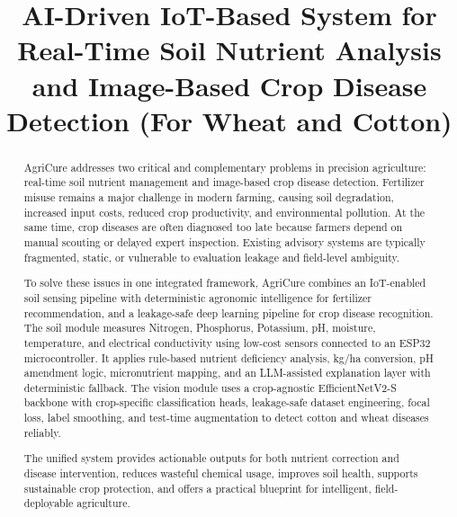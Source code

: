 \documentclass[conference]{IEEEtran}
\begin{document}
\title{AI-Driven IoT-Based System for Real-Time Soil Nutrient Analysis and Image-Based Crop Disease Detection (For Wheat and Cotton)}

\author{

\vspace{0.4cm}

}

\maketitle

\begin{abstract}
AgriCure addresses two critical and complementary problems in precision agriculture: real-time soil nutrient management and image-based crop disease detection. Fertilizer misuse remains a major challenge in modern farming, causing soil degradation, increased input costs, reduced crop productivity, and environmental pollution. At the same time, crop diseases are often diagnosed too late because farmers depend on manual scouting or delayed expert inspection. Existing advisory systems are typically fragmented, static, or vulnerable to evaluation leakage and field-level ambiguity.

To solve these issues in one integrated framework, AgriCure combines an IoT-enabled soil sensing pipeline with deterministic agronomic intelligence for fertilizer recommendation, and a leakage-safe deep learning pipeline for crop disease recognition. The soil module measures Nitrogen, Phosphorus, Potassium, pH, moisture, temperature, and electrical conductivity using low-cost sensors connected to an ESP32 microcontroller. It applies rule-based nutrient deficiency analysis, kg/ha conversion, pH amendment logic, micronutrient mapping, and an LLM-assisted explanation layer with deterministic fallback. The vision module uses a crop-agnostic EfficientNetV2-S backbone with crop-specific classification heads, leakage-safe dataset engineering, focal loss, label smoothing, and test-time augmentation to detect cotton and wheat diseases reliably.

The unified system provides actionable outputs for both nutrient correction and disease intervention, reduces wasteful chemical usage, improves soil health, supports sustainable crop protection, and offers a practical blueprint for intelligent, field-deployable agriculture.
\end{abstract}
\end{document}
